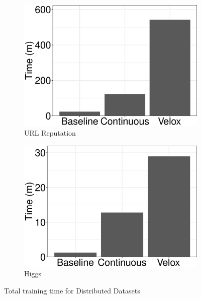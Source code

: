 \documentclass{vldb}
\begin{document}
\begin{figure}[h]
\centering
\begin{subfigure}[b]{0.5\columnwidth}
	\includegraphics[width=\linewidth, height=\linewidth,keepaspectratio]{../images/experiment-results/url-reputation-times.eps}
	\caption{URL Reputation}
	\label{fig:url-times}
\end{subfigure}%
\begin{subfigure}[b]{0.5\columnwidth}
	\includegraphics[width=\linewidth, height=\linewidth,keepaspectratio]{../images/experiment-results/higgs-times.eps}
	\caption{Higgs}
	\label{fig:higgs-times}
\end{subfigure}
\vspace{2mm}
\caption{Total training time for Distributed Datasets}
 \label{fig:cluster-training-time}
\end{figure}
\end{document}
